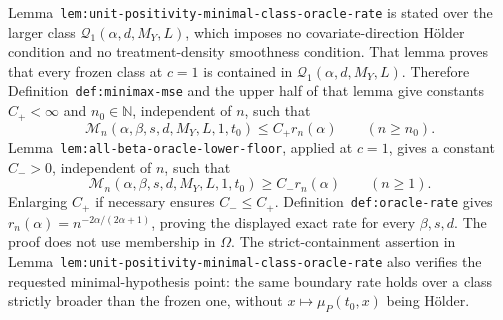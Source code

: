 Lemma~\texttt{lem:unit-positivity-minimal-class-oracle-rate} is stated over the larger class \(\mathcal Q_1(\alpha,d,M_Y,L)\), which imposes no covariate-direction H\"older condition and no treatment-density smoothness condition. That lemma proves that every frozen class at \(c=1\) is contained in \(\mathcal Q_1(\alpha,d,M_Y,L)\). Therefore Definition~\texttt{def:minimax-mse} and the upper half of that lemma give constants \(C_+<\infty\) and \(n_0\in\mathbb N\), independent of \(n\), such that
\[
\mathcal M_n(\alpha,\beta,s,d,M_Y,L,1,t_0)
\le C_+r_n(\alpha)
\qquad(n\ge n_0).
\]
Lemma~\texttt{lem:all-beta-oracle-lower-floor}, applied at \(c=1\), gives a constant \(C_->0\), independent of \(n\), such that
\[
\mathcal M_n(\alpha,\beta,s,d,M_Y,L,1,t_0)
\ge C_-r_n(\alpha)
\qquad(n\ge1).
\]
Enlarging \(C_+\) if necessary ensures \(C_-\le C_+\). Definition~\texttt{def:oracle-rate} gives \(r_n(\alpha)=n^{-2\alpha/(2\alpha+1)}\), proving the displayed exact rate for every \(\beta,s,d\). The proof does not use membership in \(\Omega\). The strict-containment assertion in Lemma~\texttt{lem:unit-positivity-minimal-class-oracle-rate} also verifies the requested minimal-hypothesis point: the same boundary rate holds over a class strictly broader than the frozen one, without \(x\mapsto\mu_P(t_0,x)\) being H\"older.